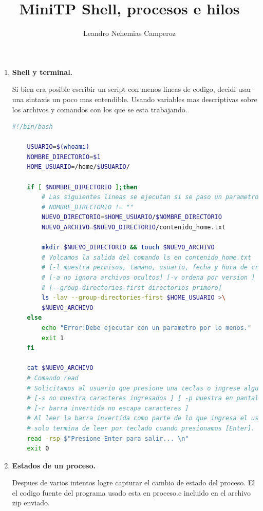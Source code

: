 \documentclass[a4paper,12pt]{article}
\author{Leandro Nehemias Camperoz}
\title{MiniTP Shell, procesos e hilos}
\begin{document}
\maketitle
\newpage
\begin{enumerate}
\item \textbf{Shell y terminal.}\newline

  Si bien era posible escribir un script con menos lineas de codigo, decidi usar una sintaxis un poco mas entendible. Usando variables mas descriptivas sobre los archivos y comandos con los que se esta trabajando.\newline
  
  \begin{lstlisting}[language=Bash,autogobble=true,basicstyle=\fontsize{9}{12}\ttfamily]
    #!/bin/bash

    USUARIO=$(whoami)
    NOMBRE_DIRECTORIO=$1
    HOME_USUARIO=/home/$USUARIO/

    if [ $NOMBRE_DIRECTORIO ];then
        # Las siguientes lineas se ejecutan si se paso un parametro
        # NOMBRE_DIRECTORIO != ""
        NUEVO_DIRECTORIO=$HOME_USUARIO/$NOMBRE_DIRECTORIO
        NUEVO_ARCHIVO=$NUEVO_DIRECTORIO/contenido_home.txt
    
        mkdir $NUEVO_DIRECTORIO && touch $NUEVO_ARCHIVO
        # Volcamos la salida del comando ls en contenido_home.txt
        # [-l muestra permisos, tamano, usuario, fecha y hora de creacion] 
        # [-a no ignora archivos ocultos] [-v ordena por version ]
        # [--group-directories-first directorios primero]
        ls -lav --group-directories-first $HOME_USUARIO >\
        $NUEVO_ARCHIVO
    else
        echo "Error:Debe ejecutar con un parametro por lo menos."
        exit 1
    fi

    cat $NUEVO_ARCHIVO
    # Comando read
    # Solicitamos al usuario que presione una teclas o ingrese algun parametro
    # [-s no muestra caracteres ingresados ] [ -p muestra en pantalla mensaje ]
    # [-r barra invertida no escapa caracteres ]
    # Al leer la barra invertida como parte de lo que ingresa el usuario
    # solo termina de leer por teclado cuando presionamos [Enter].
    read -rsp $"Presione Enter para salir... \n" 
    exit 0
  \end{lstlisting}
  \newpage
\item \textbf{Estados de un proceso.}\newline
  
  Despues de varios intentos logre capturar el cambio de estado del proceso. El el codigo fuente del programa usado esta en proceso.c incluido en el archivo zip enviado.\newline
  

\end{enumerate}
\end{document}
